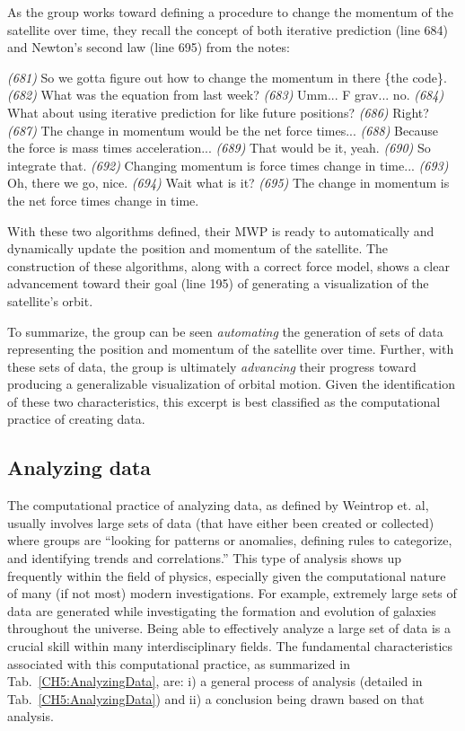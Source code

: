 \documentclass{msuphddissertation}
\begin{document}
\begin{doublespace}
As the group works toward defining a procedure to change the momentum of the satellite over time, they recall the concept of both iterative prediction (line 684) and Newton's second law (line 695) from the notes:
\begin{description}
\SB \textit{(681)} So we gotta figure out how to change the momentum in there \{the code\}.
\SB \textit{(682)} What was the equation from last week?		
\SA \textit{(683)} Umm... F grav... no.
\SD \textit{(684)} What about using iterative prediction for like future positions?
\SD \textit{(686)} Right?
\SC \textit{(687)} The change in momentum would be the net force times...	
\SB \textit{(688)} Because the force is mass times acceleration...
\SC \textit{(689)} That would be it, yeah.
\SB \textit{(690)} So integrate that.
\SC \textit{(692)} Changing momentum is force times change in time...
\SB \textit{(693)} Oh, there we go, nice.
\SA \textit{(694)} Wait what is it?
\SB \textit{(695)} The change in momentum is the net force times change in time.
\end{description}  With these two algorithms defined, their MWP is ready to automatically and dynamically update the position and momentum of the satellite.  The construction of these algorithms, along with a correct force model, shows a clear advancement toward their goal (line 195) of generating a visualization of the satellite's orbit.

To summarize, the group can be seen \textit{automating} the generation of sets of data representing the position and momentum of the satellite over time.  Further, with these sets of data, the group is ultimately \textit{advancing} their progress toward producing a generalizable visualization of orbital motion.  Given the identification of these two characteristics, this excerpt is best classified as the computational practice of creating data.

%
%
%
%
%
%
%
%
%
%
%
%
%
%
%
%

\subsection{Analyzing data}

The computational practice of analyzing data, as defined by Weintrop et. al, usually involves large sets of data (that have either been created or collected) where groups are ``looking for patterns or anomalies, defining rules to categorize, and identifying trends and correlations.''  This type of analysis shows up frequently within the field of physics, especially given the computational nature of many (if not most) modern investigations.  For example, extremely large sets of data are generated while investigating the formation and evolution of galaxies throughout the universe.  Being able to effectively analyze a large set of data is a crucial skill within many interdisciplinary fields.  The fundamental characteristics associated with this computational practice, as summarized in Tab.~\ref{CH5:AnalyzingData}, are: i) a general process of analysis (detailed in Tab.~\ref{CH5:AnalyzingData}) and ii) a conclusion being drawn based on that analysis.


\end{doublespace}
\end{document}
